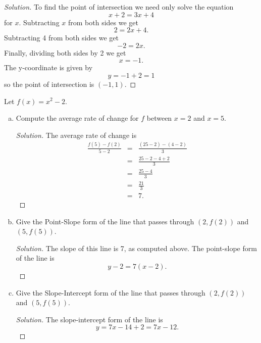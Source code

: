 \documentclass[12pt]{amsart}
\begin{document}
\begin{proof}[Solution]
  To find the point of intersection we need only solve the equation
  $$x + 2 = 3x + 4$$
  for $x$.
  Subtracting $x$ from both sides we get
  \[2 = 2x + 4.\]
  Subtracting 4 from both sides we get
  \[-2 = 2x.\]
  Finally, dividing both sides by 2 we get
  \[x = -1.\]
  The y-coordinate is given by
  \[y = -1 + 2 = 1\]
  so the point of intersection is \((-1,1)\).
\end{proof}

\begin{thm}[16 Points]\label{ex9}
  Let $f(x) = x^2 - 2$.
  \begin{enumerate}[(a)]
  \item
    Compute the average rate of change for $f$ between $x = 2$ and $x = 5$.
    \begin{proof}[Solution]
      The average rate of change is
      \begin{eqnarray*}
        \frac{f(5) - f(2)}{5 - 2} &=& \frac{(25 - 2) - (4 - 2)}{3}\\
        &=& \frac{25 - 2 - 4 + 2}{3}\\
        &=& \frac{25 - 4}{3}\\
        &=& \frac{21}{3}\\
        &=& 7.
      \end{eqnarray*}
    \end{proof}
  \item
    Give the Point-Slope form of the line that passes through $(2, f(2))$ and $(5, f(5))$.
    \begin{proof}[Solution]
      The slope of this line is 7, as computed above.
      The point-slope form of the line is
      \[y - 2 = 7(x - 2).\]
    \end{proof}
  \item
    Give the Slope-Intercept form of the line that passes through $(2, f(2))$ and $(5, f(5))$.
    \begin{proof}[Solution]
      The slope-intercept form of the line is
      \[y = 7x - 14 + 2 = 7x - 12.\]
    \end{proof}
  \end{enumerate}
\end{thm}
\end{document}
